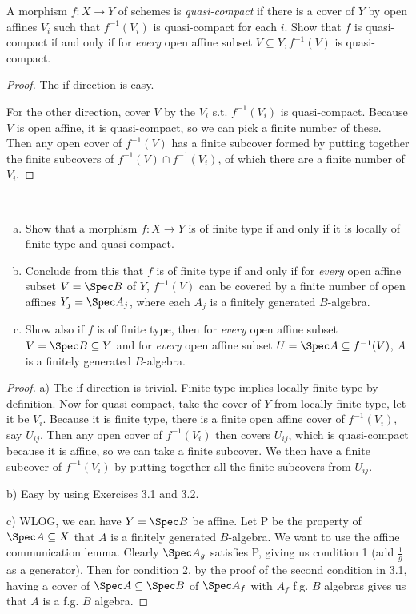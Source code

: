 \begin{exercise}%
	A morphism $f: X\to Y $ of schemes is \textit{quasi-compact} if there is a cover of $Y $ by open affines $V_i$ such that $f^{-1}(V_i) $ is quasi-compact for each $i $. Show that $f $ is quasi-compact if and only if for \textit{every} open affine subset $V\subseteq Y, f^{-1}(V) $ is quasi-compact.
\end{exercise}
\begin{proof}
	The if direction is easy.

	For the other direction, cover $V $ by the $V_i $ s.t. $f^{-1}(V_i) $ is quasi-compact.
	Because $V $ is open affine, it is quasi-compact, so we can pick a finite number of these.
	Then any open cover of $f^{-1}(V) $ has a finite subcover formed by putting together the finite subcovers of $f^{-1}(V) \cap f^{-1}(V_i) $, of which there are a finite number of $V_i $.
\end{proof}

\begin{exercise}%
	~
	\begin{enumerate}[(a)]
		\item Show that a morphism $f: X\to Y $ is of finite type if and only if it is locally of finite type and quasi-compact.
		\item Conclude from this that $f $ is of finite type if and only if for \textit{every} open affine subset $V = \Spec B $ of $Y $, $f^{-1}(V) $ can be covered by a finite number of open affines $Y_j = \Spec A_j $, where each $A_j $ is a finitely generated $B $-algebra.
		\item Show also if $f $ is of finite type, then for \textit{every} open affine subset $V = \Spec B \subseteq  Y $ and for \textit{every} open affine subset $U = \Spec A \subseteq f^{-1}(V) $, $A $ is a finitely generated $B $-algebra.
	\end{enumerate}
\end{exercise}
\begin{proof}
	a) The if direction is trivial.
	Finite type implies locally finite type by definition.
	Now for quasi-compact, take the cover of $Y $ from locally finite type, let it be $V_i $.
	Because it is finite type, there is a finite open affine cover of $f^{-1}(V_i) $, say $U_{ij} $.
	Then any open cover of $f^{-1}(V_i) $ then covers $U_{ij} $, which is quasi-compact because it is affine, so we can take a finite subcover.
	We then have a finite subcover of $f^{-1}(V_i) $ by putting together all the finite subcovers from $U_{ij} $.

	b) Easy by using Exercises 3.1 and 3.2.

	c) WLOG, we can have $Y=\Spec B $ be affine. Let P be the property of $\Spec A \subseteq X$ that $A $ is a finitely generated $B $-algebra.
	We want to use the affine communication lemma.
	Clearly $\Spec A_g $ satisfies P, giving us condition 1 (add $\frac{1}{g} $ as a generator).
	Then for condition 2, by the proof of the second condition in 3.1, having a cover of $\Spec A\subseteq \Spec B $ of $\Spec A_f $ with $A_f $ f.g. $B $ algebras gives us that $A $ is a f.g. $B $ algebra.
\end{proof}


